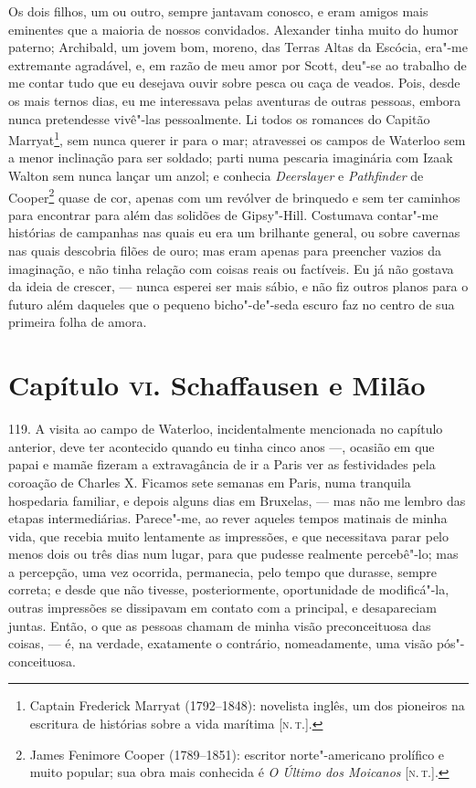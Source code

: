 Os dois filhos, um ou outro, sempre jantavam conosco, e eram amigos mais
eminentes que a maioria de nossos convidados. Alexander tinha muito do
humor paterno; Archibald, um jovem bom, moreno, das Terras Altas da
Escócia, era"-me extremante agradável, e, em razão de meu amor por Scott,
deu"-se ao trabalho de me contar tudo que eu desejava ouvir sobre pesca
ou caça de veados. Pois, desde os mais ternos dias, eu me interessava
pelas aventuras de outras pessoas, embora nunca pretendesse vivê"-las
pessoalmente. Li todos os romances do Capitão Marryat\footnote{Captain
  Frederick Marryat (1792--1848): novelista inglês, um dos pioneiros na
  escritura de histórias sobre a vida marítima {[}\textsc{n.\,t.}{]}.}, sem
nunca querer ir para o mar; atravessei os campos de Waterloo sem a menor
inclinação para ser soldado; parti numa pescaria imaginária com Izaak
Walton sem nunca lançar um anzol; e conhecia \emph{Deerslayer} e
\emph{Pathfinder} de Cooper\footnote{James Fenimore Cooper (1789--1851):
  escritor norte"-americano prolífico e muito popular; sua obra mais
  conhecida é \emph{O Último dos Moicanos} {[}\textsc{n.\,t.}{]}.} quase de
cor, apenas com um revólver de brinquedo e sem ter caminhos para
encontrar para além das solidões de Gipsy"-Hill. Costumava contar"-me
histórias de campanhas nas quais eu era um brilhante general, ou sobre
cavernas nas quais descobria filões de ouro; mas eram apenas para
preencher vazios da imaginação, e não tinha relação com coisas reais ou
factíveis. Eu já não gostava da ideia de crescer, --- nunca esperei ser
mais sábio, e não fiz outros planos para o futuro além daqueles que o
pequeno bicho"-de"-seda escuro faz no centro de sua primeira folha de
amora.

\chapter{Capítulo \textsc{vi}. Schaffausen e Milão}

119. A visita ao campo de Waterloo, incidentalmente mencionada no
capítulo anterior, deve ter acontecido quando eu tinha cinco anos ---,
ocasião em que papai e mamãe fizeram a extravagância de ir a Paris ver
as festividades pela coroação de Charles X. Ficamos sete semanas em
Paris, numa tranquila hospedaria familiar, e depois alguns dias em
Bruxelas, --- mas não me lembro das etapas intermediárias. Parece"-me, ao
rever aqueles tempos matinais de minha vida, que recebia muito
lentamente as impressões, e que necessitava parar pelo menos dois ou
três dias num lugar, para que pudesse realmente percebê"-lo; mas a
percepção, uma vez ocorrida, permanecia, pelo tempo que durasse, sempre
correta; e desde que não tivesse, posteriormente, oportunidade de
modificá"-la, outras impressões se dissipavam em contato com a principal,
e desapareciam juntas. Então, o que as pessoas chamam de minha visão
preconceituosa das coisas, --- é, na verdade, exatamente o contrário,
nomeadamente, uma visão pós"-conceituosa.

